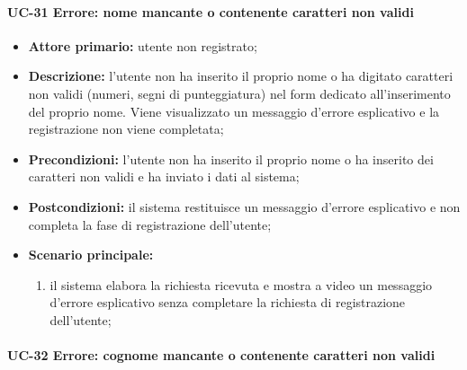 \paragraph{UC-31 Errore: nome mancante o contenente caratteri non validi}

	\begin{itemize}
		\item \textbf{Attore primario:} utente non registrato;

		\item \textbf{Descrizione:} l'utente non ha inserito il proprio nome o ha digitato caratteri non validi (numeri, segni di punteggiatura) nel form dedicato all'inserimento del proprio nome. Viene visualizzato un messaggio d'errore esplicativo e la registrazione non viene completata;

		\item \textbf{Precondizioni:} l'utente non ha inserito il proprio nome o ha inserito dei caratteri non validi e ha inviato i dati al sistema;

		\item \textbf{Postcondizioni:} il sistema restituisce un messaggio d'errore esplicativo e non completa la fase di registrazione dell'utente;

		\item \textbf{Scenario principale:}
	  		\begin{enumerate}
		  		\item il sistema elabora la richiesta ricevuta e mostra a video un messaggio d'errore esplicativo senza completare la richiesta di registrazione dell'utente; 
	  		\end{enumerate}
	\end{itemize}
 

	\paragraph{UC-32 Errore: cognome mancante o contenente caratteri non validi}

